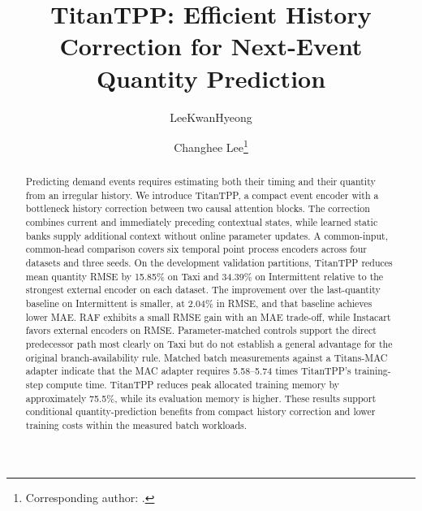\documentclass[runningheads]{llncs}
\begin{document}
\title{TitanTPP: Efficient History Correction for Next-Event Quantity Prediction}
\author{LeeKwanHyeong \and Changhee Lee\thanks{Corresponding author: .}}
\maketitle

\begin{abstract}
Predicting demand events requires estimating both their timing and their
quantity from an irregular history. We introduce TitanTPP, a compact event
encoder with a bottleneck history correction between two causal attention
blocks. The correction combines current and immediately preceding contextual
states, while learned static banks supply additional context without online
parameter updates. A common-input, common-head comparison covers six temporal
point process encoders across four datasets and three seeds. On the development
validation partitions, TitanTPP reduces mean quantity RMSE by 15.85\% on Taxi
and 34.39\% on Intermittent relative to the strongest external encoder on each
dataset. The improvement over the last-quantity baseline on Intermittent is
smaller, at 2.04\% in RMSE, and that baseline achieves lower MAE. RAF exhibits
a small RMSE gain with an MAE trade-off, while Instacart favors external
encoders on RMSE. Parameter-matched controls support the direct predecessor
path most clearly on Taxi but do not establish a general advantage for the
original branch-availability rule. Matched batch measurements against a Titans-MAC adapter
indicate that the MAC adapter requires 5.58--5.74 times TitanTPP's
training-step compute time. TitanTPP reduces peak allocated training memory by
approximately 75.5\%, while its evaluation memory is higher. These results
support conditional quantity-prediction benefits from compact history
correction and lower training costs within the measured batch workloads.
\end{abstract}
\end{document}

